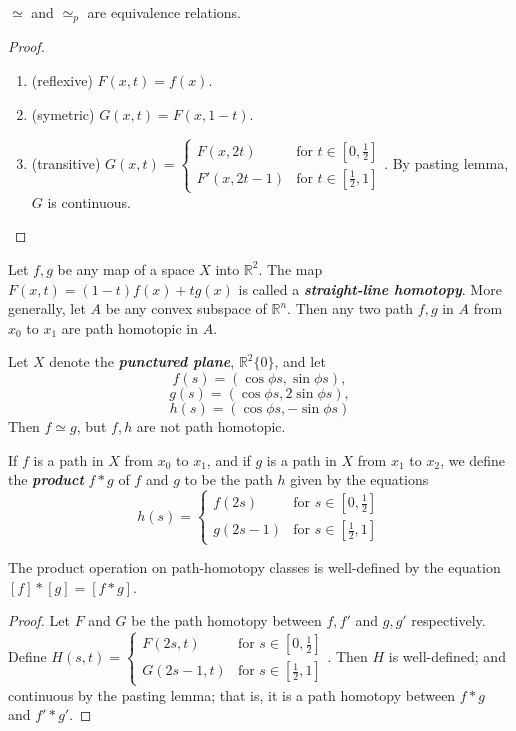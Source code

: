 \begin{myproposition}
$\simeq$ and $\simeq_p$ are equivalence relations.
\end{myproposition}
\begin{proof}
\begin{enumerate}[label={(\alph*)}]
\item (reflexive) $F(x,t)=f(x)$.
\item (symetric) $G(x,t) = F(x,1-t)$.
\item (transitive) $G(x,t)=\begin{cases}
F(x,2t) & \text{for }t\in [0, \frac{1}{2}] \\
F'(x,2t-1) & \text{for }t\in [\frac{1}{2},1]
\end{cases}$. By pasting lemma, $G$ is continuous.
\end{enumerate}
\end{proof}

\begin{example}
Let $f,g$ be any map of a space $X$ into $\mathbb{R}^2$. The map $F(x,t)=(1-t)f(x)+tg(x)$ is called a \textbf{\emph{straight-line homotopy}}. More generally, let $A$ be any convex subspace of $\mathbb{R}^n$. Then any two path $f,g$ in $A$ from $x_0$ to $x_1$ are path homotopic in $A$.
\end{example}

\begin{example}
Let $X$ denote the \textbf{\emph{punctured plane}}, $\mathbb{R}^2 \{0\}$, and let
$$f(s)=(\cos \phi s,\sin \phi s),$$
$$g(s)=(\cos \phi s,2\sin \phi s),$$
$$h(s)=(\cos \phi s,-\sin \phi s)$$
Then $f\simeq g$, but $f,h$ are not path homotopic.
\end{example}

\begin{mydefinition}
If $f$ is a path in $X$ from $x_0$ to $x_1$, and if $g$ is a path in $X$ from $x_1$ to $x_2$, we define the \textbf{\emph{product}} $f*g$ of $f$ and $g$ to be the path $h$ given by the equations
$$h(s) = \begin{cases}
f(2s) & \text{for }s\in [0,\frac{1}{2}] \\
g(2s-1) & \text{for }s\in [\frac{1}{2},1]
\end{cases}$$
\end{mydefinition}

\begin{mylemma}
The product operation on path-homotopy classes is well-defined by the equation $[f]*[g]=[f*g]$.
\end{mylemma}
\begin{proof}
Let $F$ and $G$ be the path homotopy between $f,f'$ and $g,g'$ respectively. Define $H(s,t)=\begin{cases}
F(2s,t) & \text{for }s\in [0,\frac{1}{2}] \\
G(2s-1,t) & \text{for }s\in [\frac{1}{2},1]
\end{cases}$. Then $H$ is well-defined; and continuous by the pasting lemma; that is, it is a path homotopy between $f*g$ and $f'*g'$.
\end{proof}

